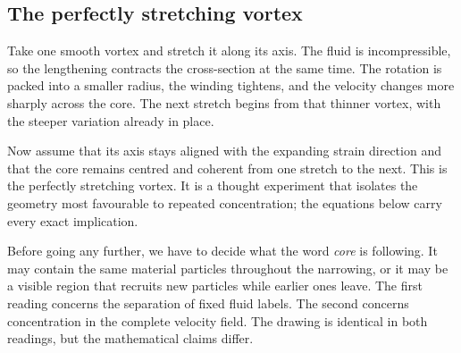 \subsection{The perfectly stretching vortex}\label{sub:ThePerfectlyStretchingVortex}

Take one smooth vortex and stretch it along its axis.
The fluid is incompressible, so the lengthening contracts the cross-section at the same time.
The rotation is packed into a smaller radius, the winding tightens, and the velocity changes more sharply across the core.
The next stretch begins from that thinner vortex, with the steeper variation already in place.

Now assume that its axis stays aligned with the expanding strain direction and that the core remains centred and coherent from one stretch to the next.
This is the perfectly stretching vortex.
It is a thought experiment that isolates the geometry most favourable to repeated concentration; the equations below carry every exact implication.

Before going any further, we have to decide what the word \emph{core} is following.
It may contain the same material particles throughout the narrowing, or it may be a visible region that recruits new particles while earlier ones leave.
The first reading concerns the separation of fixed fluid labels.
The second concerns concentration in the complete velocity field.
The drawing is identical in both readings, but the mathematical claims differ.


